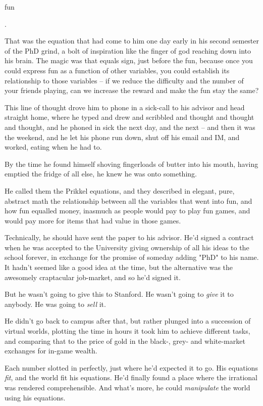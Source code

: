 fun

.

That was the equation that had come to him one day early in his
second semester of the PhD grind, a bolt of inspiration like the
finger of god reaching down into his brain. The magic was that
equals sign, just before the fun, because once you could express
fun as a function of other variables, you could establish its
relationship to those variables -- if we reduce the difficulty and
the number of your friends playing, can we increase the reward and
make the fun stay the same?

This line of thought drove him to phone in a sick-call to his
advisor and head straight home, where he typed and drew and
scribbled and thought and thought and thought, and he phoned in
sick the next day, and the next -- and then it was the weekend, and
he let his phone run down, shut off his email and IM, and worked,
eating when he had to.

By the time he found himself shoving fingerloads of butter into his
mouth, having emptied the fridge of all else, he knew he was onto
something.

He called them the Prikkel equations, and they described in
elegant, pure, abstract math the relationship between all the
variables that went into fun, and how fun equalled money, inasmuch
as people would pay to play fun games, and would pay more for items
that had value in those games.

Technically, he should have sent the paper to his advisor. He'd
signed a contract when he was accepted to the University giving
ownership of all his ideas to the school forever, in exchange for
the promise of someday adding "PhD" to his name. It hadn't seemed
like a good idea at the time, but the alternative was the awesomely
craptacular job-market, and so he'd signed it.

But he wasn't going to give this to Stanford. He wasn't going to
\emph{give} it to anybody. He was going to \emph{sell} it.

He didn't go back to campus after that, but rather plunged into a
succession of virtual worlds, plotting the time in hours it took
him to achieve different tasks, and comparing that to the price of
gold in the black-, grey- and white-market exchanges for in-game
wealth.

Each number slotted in perfectly, just where he'd expected it to
go. His equations \emph{fit}, and the world fit his equations. He'd
finally found a place where the irrational was rendered
comprehensible. And what's more, he could \emph{manipulate} the
world using his equations.

